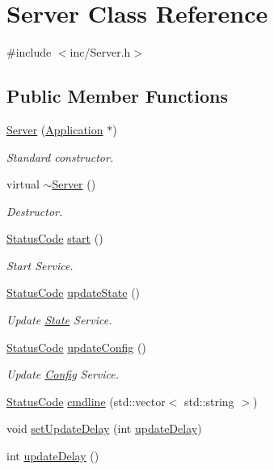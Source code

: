 \hypertarget{classServer}{}\section{Server Class Reference}
\label{classServer}


{\ttfamily \#include $<$inc/\+Server.\+h$>$}

\subsection*{Public Member Functions}
\begin{DoxyCompactItemize}
\item 
\hyperlink{classServer_ac808c867e64a7f139b1958abeb387a15}{Server} (\hyperlink{classApplication}{Application} $\ast$)
\begin{DoxyCompactList}\small\item\em Standard constructor. \end{DoxyCompactList}\item 
virtual \hyperlink{classServer_a4b3aa2579cb1c8cd1d069582c14d0fa6}{$\sim$\+Server} ()
\begin{DoxyCompactList}\small\item\em Destructor. \end{DoxyCompactList}\item 
\hyperlink{classStatusCode}{Status\+Code} \hyperlink{classServer_a039cc5b24c26fa5bb8145335f27bb28e}{start} ()
\begin{DoxyCompactList}\small\item\em Start Service. \end{DoxyCompactList}\item 
\hyperlink{classStatusCode}{Status\+Code} \hyperlink{classServer_abaa0b878f4f96454339f1989ec12cc6b}{update\+State} ()
\begin{DoxyCompactList}\small\item\em Update \hyperlink{classState}{State} Service. \end{DoxyCompactList}\item 
\hyperlink{classStatusCode}{Status\+Code} \hyperlink{classServer_af58d60a5587813e2aab7fc9016dfa01a}{update\+Config} ()
\begin{DoxyCompactList}\small\item\em Update \hyperlink{classConfig}{Config} Service. \end{DoxyCompactList}\item 
\hyperlink{classStatusCode}{Status\+Code} \hyperlink{classServer_adc7d38a333b12fbe03db3d209f5feae9}{cmdline} (std\+::vector$<$ std\+::string $>$)
\item 
void \hyperlink{classServer_ac885fb635733c69a28fe3ec9bd21eac5}{set\+Update\+Delay} (int \hyperlink{classServer_ac3b91a1bf06dab7911e6d1b867d677bc}{update\+Delay})
\item 
int \hyperlink{classServer_ac3b91a1bf06dab7911e6d1b867d677bc}{update\+Delay} ()
\end{DoxyCompactItemize}
